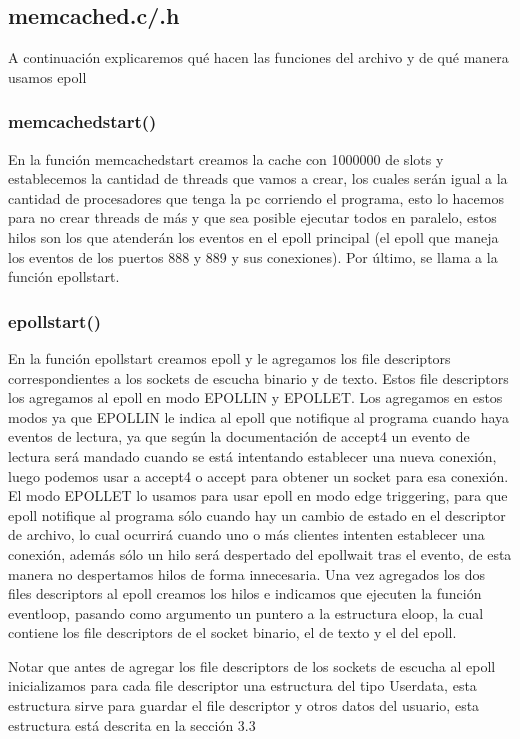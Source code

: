 \documentclass{article}
\begin{document}
\subsection{memcached.c/.h}

A continuación explicaremos qué hacen las funciones del
archivo y de qué manera usamos epoll

\subsubsection{memcached\textunderscore start()}
En la función memcached\textunderscore start creamos la cache con
1000000 de slots y establecemos la cantidad de threads
que vamos a crear, los cuales serán igual a la cantidad de
procesadores que tenga la pc corriendo el programa, esto
lo hacemos para no crear threads de más y que sea posible
ejecutar todos en paralelo, estos hilos son los que atenderán
los eventos en el epoll principal (el epoll que maneja
los eventos de los puertos 888 y 889 y sus conexiones).
Por último, se llama a la función epoll\textunderscore start.

\subsubsection{epoll\textunderscore start()}
En la función epoll\textunderscore start creamos epoll y le
agregamos los file descriptors correspondientes a los sockets
de escucha binario y de texto. Estos file descriptors los
agregamos al epoll en modo EPOLLIN y EPOLLET. Los agregamos
en estos modos ya que EPOLLIN le indica al epoll que notifique
al programa cuando haya eventos de lectura, ya que según la
documentación de accept4 un evento de lectura será mandado
cuando se está intentando establecer una nueva conexión, luego
podemos usar a accept4 o accept para obtener un socket para
esa conexión. El modo EPOLLET lo usamos para usar epoll en
modo edge triggering, para que epoll notifique
al programa sólo cuando hay un cambio de estado en el descriptor
de archivo, lo cual ocurrirá cuando uno o más clientes intenten
establecer una conexión, además sólo un hilo será despertado
del epoll\textunderscore wait tras el evento, de esta manera no despertamos
hilos de forma innecesaria. Una vez
agregados los dos files descriptors al epoll creamos los hilos
e indicamos que ejecuten la función eventloop, pasando como
argumento un puntero a la estructura eloop, la cual contiene
los file descriptors de el socket binario, el de texto y el
del epoll.

Notar que antes de agregar los file descriptors de los sockets
de escucha al epoll inicializamos para cada file descriptor
una estructura del tipo User\textunderscore data, esta 
estructura sirve para guardar el file descriptor y otros
datos del usuario, esta estructura está descrita en
la sección 3.3
\end{document}

